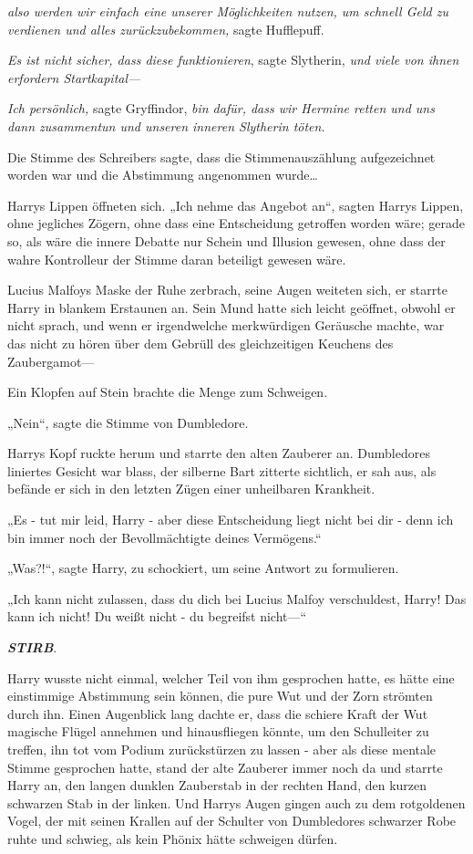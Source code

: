 {\emph{also werden wir einfach eine unserer Möglichkeiten nutzen, um schnell Geld zu verdienen und alles zurückzubekommen,} sagte Hufflepuff.

\emph{Es ist nicht sicher, dass diese funktionieren}, sagte Slytherin, \emph{und viele von ihnen erfordern Startkapital—}

\emph{Ich persönlich,} sagte Gryffindor, \emph{bin dafür, dass wir Hermine retten und uns dann zusammentun und unseren inneren Slytherin töten}.

Die Stimme des Schreibers sagte, dass die Stimmenauszählung aufgezeichnet worden war und die Abstimmung angenommen wurde…

Harrys Lippen öffneten sich. „Ich nehme das Angebot an“, sagten Harrys Lippen, ohne jegliches Zögern, ohne dass eine Entscheidung getroffen worden wäre; gerade so, als wäre die innere Debatte nur Schein und Illusion gewesen, ohne dass der wahre Kontrolleur der Stimme daran beteiligt gewesen wäre.

Lucius Malfoys Maske der Ruhe zerbrach, seine Augen weiteten sich, er starrte Harry in blankem Erstaunen an. Sein Mund hatte sich leicht geöffnet, obwohl er nicht sprach, und wenn er irgendwelche merkwürdigen Geräusche machte, war das nicht zu hören über dem Gebrüll des gleichzeitigen Keuchens des Zaubergamot—

Ein Klopfen auf Stein brachte die Menge zum Schweigen.

„Nein“, sagte die Stimme von Dumbledore.

Harrys Kopf ruckte herum und starrte den alten Zauberer an. Dumbledores liniertes Gesicht war blass, der silberne Bart zitterte sichtlich, er sah aus, als befände er sich in den letzten Zügen einer unheilbaren Krankheit.

„Es - tut mir leid, Harry - aber diese Entscheidung liegt nicht bei dir - denn ich bin immer noch der Bevollmächtigte deines Vermögens.“

„Was?!“, sagte Harry, zu schockiert, um seine Antwort zu formulieren.

„Ich kann nicht zulassen, dass du dich bei Lucius Malfoy verschuldest, Harry! Das kann ich nicht! Du weißt nicht - du begreifst nicht—“

\textbf{\emph{STIRB}}.

Harry wusste nicht einmal, welcher Teil von ihm gesprochen hatte, es hätte eine einstimmige Abstimmung sein können, die pure Wut und der Zorn strömten durch ihn. Einen Augenblick lang dachte er, dass die schiere Kraft der Wut magische Flügel annehmen und hinausfliegen könnte, um den Schulleiter zu treffen, ihn tot vom Podium zurückstürzen zu lassen - aber als diese mentale Stimme gesprochen hatte, stand der alte Zauberer immer noch da und starrte Harry an, den langen dunklen Zauberstab in der rechten Hand, den kurzen schwarzen Stab in der linken. Und Harrys Augen gingen auch zu dem rotgoldenen Vogel, der mit seinen Krallen auf der Schulter von Dumbledores schwarzer Robe ruhte und schwieg, als kein Phönix hätte schweigen dürfen.

}
